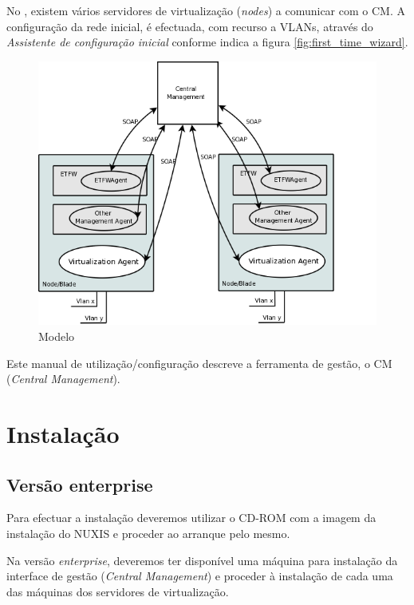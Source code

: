 No \acronym, existem vários servidores de virtualização (\emph{nodes}) a comunicar com o CM. A configuração da rede inicial, é efectuada, com recurso a VLANs, através do \emph{Assistente de configuração inicial} conforme indica a figura \ref{fig:first_time_wizard}.
\begin{figure}[H]
    \begin{center}
	\includegraphics[scale=0.6]{screenshots/etva_enterprise.png}
	\caption{Modelo \acronym}
	\label{fig:etva_enterprise}
	\end{center}
\end{figure}
 
Este manual de utilização/configuração descreve a ferramenta de gestão, o CM (\emph{Central Management}).

\pagebreak
\chapter{\textsf{Instalação}}
\label{chp:installation}
\section{Versão enterprise}

Para efectuar a instalação deveremos utilizar o CD-ROM com a imagem da instalação do NUXIS e proceder ao arranque pelo mesmo.

Na versão \emph{enterprise}, deveremos ter disponível uma máquina para instalação da interface de gestão (\emph{Central Management}) e proceder à instalação de cada uma das máquinas dos servidores de virtualização.

